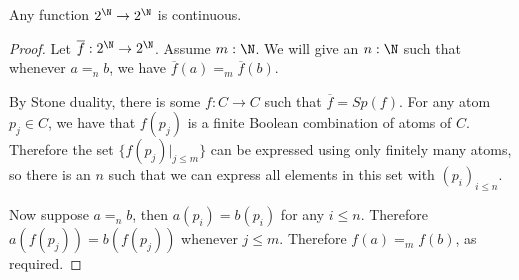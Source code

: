 \begin{lemma}
  Any function $2^\N\to 2^\N$ is continuous. 
\end{lemma} 
\begin{proof}
  Let $\overline f : 2^\N \to 2^\N$. 
  Assume $m :\N$. We will give an $n:\N$ such that 
  whenever $a=_n b$, we have $\overline f(a) =_m \overline f(b)$. 

  By Stone duality, there is some $f: C \to C$ such that $\overline f = Sp(f)$. 
  For any atom $p_j\in C$, we have that $f(p_j)$ is a finite Boolean combination
  of atoms of $C$.
  Therefore the set $\{f(p_j)|_{j\leq m}\} $ can be expressed using only
  finitely many atoms, so there is an $n$ such that we can express 
  all elements in this set with $(p_i)_{i\leq n}$. 

  Now suppose $a=_n b$, then $a(p_i) = b(p_i)$ for any $i \leq n$. 
  Therefore $a(f(p_j)) = b(f(p_j))$ whenever $j\leq m$. 
  Therefore $f(a) =_m f(b)$, as required. 


\end{proof}
